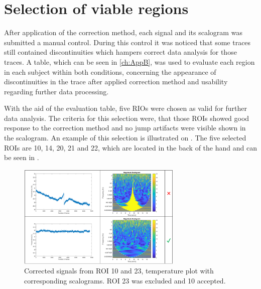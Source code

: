 \section{Selection of viable regions}

After application of the correction method, each signal and its scalogram was submitted a manual control. During this control it was noticed that some traces still contained discontinuities which hampers correct data analysis for those traces. A table, which can be seen in \ref{ch:AppB}, was used to evaluate each region in each subject within both conditions, concerning the appearance of discontinuities in the trace after applied correction method and usability regarding further data processing.

With the aid of the evaluation table, five RIOs were chosen as valid for further data analysis. The criteria for this selection were, that those ROIs showed good response to the correction method and no jump artifacts were visible shown in the scalogram. An example of this selection is illustrated on . The five selected ROIs are 10, 14, 20, 21 and 22, which are located in the back of the hand and can be seen in .

\begin{figure}[H]
	\includegraphics[width=0.7\textwidth]{figures/ROI_selection}
	\caption{Corrected signals from ROI 10 and 23, temperature plot with corresponding scalograms. ROI 23 was excluded and 10 accepted.}
	\label{fig:selection}
\end{figure} 